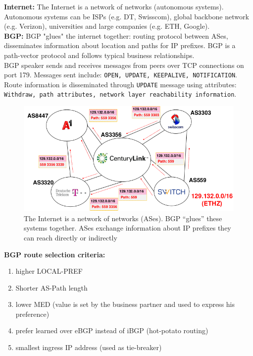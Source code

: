 \documentclass[11pt,oneside,a4paper]{article}
\begin{document}
\textbf{Internet:} The Internet is a network of networks (autonomous systems). Autonomous systems can be ISPs (e.g. DT, Swisscom), global backbone network (e.g. Verizon), universities and large companies (e.g. ETH, Google).\\

\textbf{BGP:} BGP "glues" the internet together: routing protocol between ASes, disseminates information about location and paths for IP prefixes. BGP is a path-vector protocol and follows typical business relationships.\\
BGP speaker sends and receives messages from peers over TCP connections on port 179. Messages sent include: \texttt{OPEN, UPDATE, KEEPALIVE, NOTIFICATION}. Route information is disseminated through \texttt{UPDATE} message using attributes: \texttt{Withdraw, path attributes, network layer reachability information}.\\

\begin{figure}
	\centering
	\includegraphics[width=0.6\linewidth]{figures/bgp_ases}
	\caption{The Internet is a network of networks (ASes). BGP “glues” these systems together. ASes exchange information about IP prefixes they can reach directly or indirectly}
	\label{fig:bgpases}
\end{figure}

\textbf{BGP route selection criteria:}

\vspace{-\topsep}
\begin{enumerate}
	\setlength{\itemsep}{0pt}
	\setlength{\parskip}{0pt}
	\item higher LOCAL-PREF
	\item Shorter AS-Path length
	\item lower MED (value is set by the business partner and used to express his preference)
	\item prefer learned over eBGP instead of iBGP (hot-potato routing)
	\item smallest ingress IP address (used as tie-breaker)
\end{enumerate}
\vspace{-\topsep}
\end{document}
